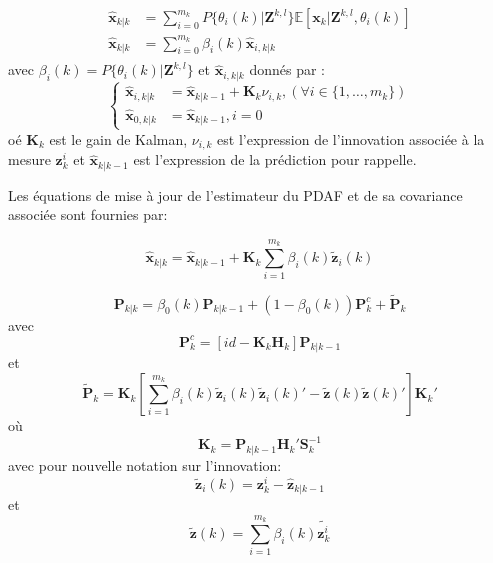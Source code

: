 \documentclass[10pt,french,a4paper]{report}
\begin{document}
	\begin{eqnarray}
				\begin{aligned}
				\hat{\mathbf{x}}_{k|k} &= \sum^{m_k}_{i=0} P\{\theta_i(k) | \mathbf{Z}^{k,l}\}\mathbb{E}[\mathbf{x}_k| \mathbf{Z}^{k,l} ,\theta_i(k) ]\\
				\hat{\mathbf{x}}_{k|k} &= \sum^{m_k}_{i=0} \beta_i(k)\hat{\mathbf{x}}_{i,k|k}
				\end{aligned}
			\end{eqnarray}
	avec $\beta_i(k) = P\{\theta_i(k)| \mathbf{Z}^{k,l} \}$ et $\hat{\mathbf{x}}_{i,k|k}$ donnés par :
	\begin{equation}
	\left\{ \begin{aligned}
	\hat{\mathbf{x}}_{i,k|k} &  = \hat{\mathbf{x}}_{k|k-1} + \mathbf{K}_k\nu_{i,k},(\forall i \in \{1,\ldots,m_k\}) \\
	\hat{\mathbf{x}}_{0,k|k} & = \hat{\mathbf{x}}_{k|k-1}, i = 0
	\end{aligned} \right.
	\end{equation}
	oé $\mathbf{K}_k$ est le gain de Kalman, $\nu_{i,k}$ est l'expression de l'innovation associée à la mesure $\mathbf{z}_k^i$ et $\hat{\mathbf{x}}_{k|k-1}$ est l'expression de la prédiction pour rappelle. 
			
			Les équations de mise à jour de l'estimateur du \acf{PDAF} et de sa covariance associée sont fournies par:
			
	\begin{equation}
	\hat{\mathbf{x}}_{k|k}   = \hat{\mathbf{x}}_{k|k-1} + \mathbf{K}_k\sum^{m_k}_{i=1} \beta_i(k)\tilde{\mathbf{z}}_i(k)
	\end{equation}
	
	\begin{equation}
	 \mathbf{P}_{k|k}   = \beta_0(k) \mathbf{P}_{k|k-1}  + (1-\beta_0(k) )\mathbf{P}^c_{k} + \tilde{\mathbf{P}}_{k} 
	\end{equation}
	avec
	\begin{equation}
	\mathbf{P}^c_{k}    = [id - \mathbf{K}_k\mathbf{H}_k] \mathbf{P}_{k|k-1}   
	\end{equation}
	et
	\begin{equation}
	\tilde{\mathbf{P}}_{k}    = \mathbf{K}_k [\sum^{m_k}_{i=1} \beta_i(k) \tilde{\mathbf{z}}_i(k)\tilde{\mathbf{z}}_i(k)'  - \tilde{\mathbf{z}}(k)\tilde{\mathbf{z}}(k)'  ]\mathbf{K}_k'  
	\end{equation}
	où
	\begin{equation}
	\mathbf{K}_k =  \mathbf{P}_{k|k-1} \mathbf{H}_k' \mathbf{S}_k^{-1}
	\end{equation}
	avec pour nouvelle notation sur l'innovation:
	\begin{equation}
	\tilde{\mathbf{z}}_i(k) = \mathbf{z}^i_{k} - \hat{\mathbf{z}}_{k|k-1}
	\end{equation}
	et
	\begin{equation}
	\tilde{\mathbf{z}}(k) =\sum^{m_k}_{i=1} \beta_i(k) \tilde{\mathbf{z}^i_{k}}
	\end{equation}
	
\end{document}
